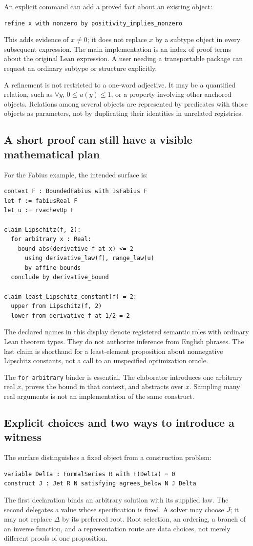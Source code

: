 \documentclass[11pt,a4paper]{article}
\theoremstyle{definition}
\theoremstyle{remark}
\newcommand{\code}[1]{\texttt{#1}}
\begin{document}
An explicit command can add a proved fact about an existing object:
\begin{lstlisting}
refine x with nonzero by positivity_implies_nonzero
\end{lstlisting}
This adds evidence of $x\ne0$; it does not replace $x$ by a subtype object in every subsequent expression. The main implementation is an index of proof terms about the original Lean expression. A user needing a transportable package can request an ordinary subtype or structure explicitly.

A refinement is not restricted to a one-word adjective. It may be a quantified relation, such as $\forall y,\,0\le u(y)\le1$, or a property involving other anchored objects. Relations among several objects are represented by predicates with those objects as parameters, not by duplicating their identities in unrelated registries.

\subsection{A short proof can still have a visible mathematical plan}
For the Fabius example, the intended surface is:
\begin{lstlisting}
context F : BoundedFabius with IsFabius F
let f := fabiusReal F
let u := rvachevUp F

claim Lipschitz(f, 2):
  for arbitrary x : Real:
    bound abs(derivative f at x) <= 2
      using derivative_law(f), range_law(u)
      by affine_bounds
  conclude by derivative_bound

claim least_Lipschitz_constant(f) = 2:
  upper from Lipschitz(f, 2)
  lower from derivative f at 1/2 = 2
\end{lstlisting}
The declared names in this display denote registered semantic roles with ordinary Lean theorem types. They do not authorize inference from English phrases. The last claim is shorthand for a least-element proposition about nonnegative Lipschitz constants, not a call to an unspecified optimization oracle.

The \code{for arbitrary} binder is essential. The elaborator introduces one arbitrary real $x$, proves the bound in that context, and abstracts over $x$. Sampling many real arguments is not an implementation of the same construct.

\subsection{Explicit choices and two ways to introduce a witness}
The surface distinguishes a fixed object from a construction problem:
\begin{lstlisting}
variable Delta : FormalSeries R with F(Delta) = 0
construct J : Jet R N satisfying agrees_below N J Delta
\end{lstlisting}
The first declaration binds an arbitrary solution with its supplied law. The second delegates a value whose specification is fixed. A solver may choose $J$; it may not replace $\Delta$ by its preferred root. Root selection, an ordering, a branch of an inverse function, and a representation route are data choices, not merely different proofs of one proposition.
\end{document}
